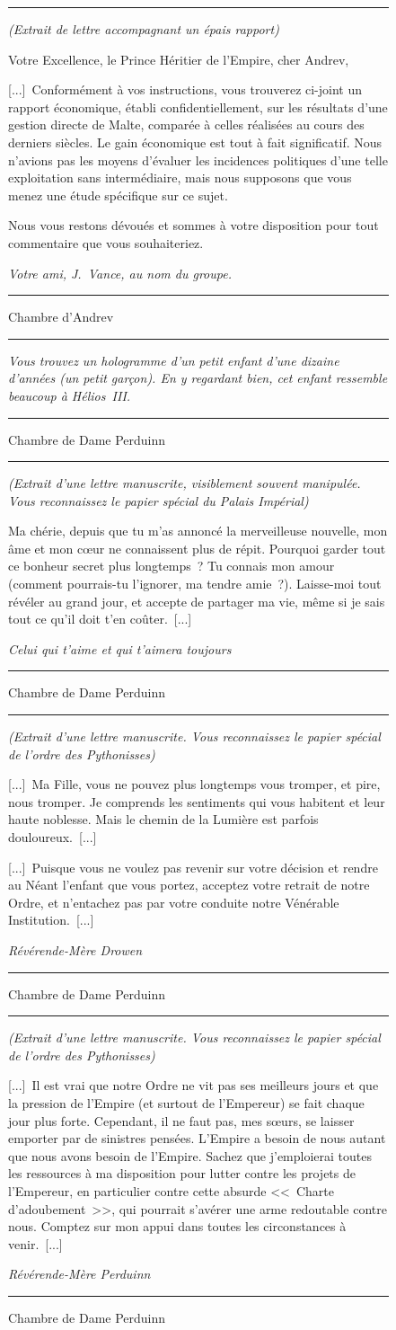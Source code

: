 \documentclass{article}
\newcommand{\newcharacter}{\clearpage\setcounter{figure}{0}}
\newcommand{\indice}[4]{
  \begin{figure}[H]
    \begin{center}
      \rule{0.5\textwidth}{1pt}
    \end{center}
    \begin{framed}
      \begin{samepage}
        \textit{#1}
        \nopagebreak

        #2

        \nopagebreak

        \hfill\textit{#3}
      \end{samepage}
    \end{framed}
    \caption{#4}
    \begin{center}
      \rule{0.5\textwidth}{1pt}
    \end{center}
  \end{figure}
}
\begin{document}
\indice
{(Extrait de lettre accompagnant un épais rapport)}
{Votre Excellence, le Prince Héritier de l'Empire, cher Andrev,

\nobreak

[...]~Conformément à vos instructions, vous trouverez ci-joint un rapport
économique, établi confidentiellement, sur les résultats d'une gestion directe
de Malte, comparée à celles réalisées au cours des derniers siècles. Le gain
économique est tout à fait significatif. Nous n'avions pas les moyens d'évaluer
les incidences politiques d'une telle exploitation sans intermédiaire, mais
nous supposons que vous menez une étude spécifique sur ce sujet.

\nobreak

Nous vous restons dévoués et sommes à votre disposition pour tout commentaire
que vous souhaiteriez.}
{Votre ami, J.~Vance, au nom du groupe.}
{Chambre d'Andrev}

\newcharacter

\indice
{Vous trouvez un hologramme d'un petit enfant d'une dizaine d'années (un petit
garçon). En y regardant bien, cet enfant ressemble beaucoup à Hélios~III.}
{}
{}
{Chambre de Dame Perduinn}

\indice
{(Extrait d'une lettre manuscrite, visiblement souvent manipulée. Vous
reconnaissez le papier spécial du Palais Impérial)}
{Ma chérie, depuis que tu m'as annoncé la merveilleuse nouvelle, mon âme
et mon cœur ne connaissent plus de répit. Pourquoi garder tout ce bonheur
secret plus longtemps~? Tu connais mon amour (comment pourrais-tu l'ignorer,
ma tendre amie~?). Laisse-moi tout révéler au grand jour, et accepte de
partager ma vie, même si je sais tout ce qu'il doit t'en coûter.~[...]}
{Celui qui t'aime et qui t'aimera toujours}
{Chambre de Dame Perduinn}

\indice
{(Extrait d'une lettre manuscrite. Vous reconnaissez le papier spécial de
l'ordre des Pythonisses)}
{[...]~Ma Fille, vous ne pouvez plus longtemps vous tromper, et pire, nous
tromper. Je comprends les sentiments qui vous habitent et leur haute noblesse.
Mais le chemin de la Lumière est parfois douloureux.~[...]

\nobreak

[...]~Puisque vous ne voulez pas revenir sur votre décision et rendre au Néant
l'enfant que vous portez, acceptez votre retrait de notre Ordre, et n'entachez
pas par votre conduite notre Vénérable Institution.~[...]}
{Révérende-Mère Drowen}
{Chambre de Dame Perduinn}

\indice
{(Extrait d'une lettre manuscrite. Vous reconnaissez le papier spécial de
l'ordre des Pythonisses)}
{[...]~Il est vrai que notre Ordre ne vit pas ses meilleurs jours et que la
pression de l'Empire (et surtout de l'Empereur) se fait chaque jour plus forte.
Cependant, il ne faut pas, mes s\oe{}urs, se laisser emporter par de sinistres
pensées. L'Empire a besoin de nous autant que nous avons besoin de l'Empire.
Sachez que j'emploierai toutes les ressources à ma disposition pour lutter
contre les projets de l'Empereur, en particulier contre cette absurde <<~Charte
d'adoubement~>>, qui pourrait s'avérer une arme redoutable contre nous. Comptez
sur mon appui dans toutes les circonstances à venir.~[...]}
{Révérende-Mère Perduinn}
{Chambre de Dame Perduinn}
\end{document}
